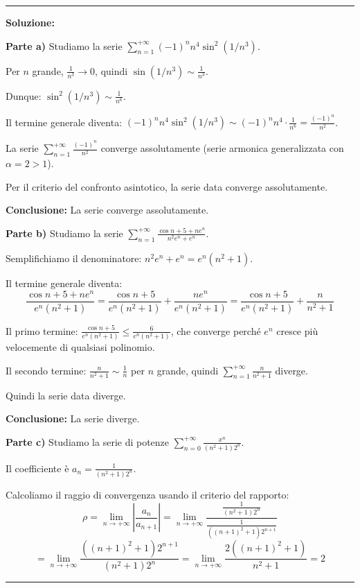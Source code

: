 \documentclass[12pt, a4paper]{article}
\newenvironment{solution}
{\par\noindent\rule{\textwidth}{0.4pt}\par\textbf{Soluzione:}\medskip\par}
{\par\rule{\textwidth}{0.4pt}\par\bigskip}
\begin{document}
\begin{solution}
\textbf{Parte a)} Studiamo la serie $\displaystyle\sum_{n=1}^{+\infty} (-1)^{n} n^{4} \sin^{2}(1/n^{3})$.

Per $n$ grande, $\frac{1}{n^3} \to 0$, quindi $\sin(1/n^3) \sim \frac{1}{n^3}$.

Dunque: $\sin^2(1/n^3) \sim \frac{1}{n^6}$.

Il termine generale diventa: $(-1)^n n^4 \sin^2(1/n^3) \sim (-1)^n n^4 \cdot \frac{1}{n^6} = \frac{(-1)^n}{n^2}$.

La serie $\displaystyle\sum_{n=1}^{+\infty} \frac{(-1)^n}{n^2}$ converge assolutamente (serie armonica generalizzata con $\alpha = 2 > 1$).

Per il criterio del confronto asintotico, la serie data converge assolutamente.

\textbf{Conclusione:} La serie converge assolutamente.

\vspace{0.5cm}

\textbf{Parte b)} Studiamo la serie $\displaystyle\sum_{n=1}^{+\infty} \frac{\cos n + 5 + ne^{n}}{n^{2}e^{n}+e^{n}}$.

Semplifichiamo il denominatore: $n^{2}e^{n}+e^{n} = e^n(n^2 + 1)$.

Il termine generale diventa:
\[
\frac{\cos n + 5 + ne^{n}}{e^n(n^2 + 1)} = \frac{\cos n + 5}{e^n(n^2 + 1)} + \frac{ne^{n}}{e^n(n^2 + 1)} = \frac{\cos n + 5}{e^n(n^2 + 1)} + \frac{n}{n^2 + 1}
\]

Il primo termine: $\frac{\cos n + 5}{e^n(n^2 + 1)} \leq \frac{6}{e^n(n^2 + 1)}$, che converge perché $e^n$ cresce più velocemente di qualsiasi polinomio.

Il secondo termine: $\frac{n}{n^2 + 1} \sim \frac{1}{n}$ per $n$ grande, quindi $\displaystyle\sum_{n=1}^{+\infty} \frac{n}{n^2 + 1}$ diverge.

Quindi la serie data diverge.

\textbf{Conclusione:} La serie diverge.

\vspace{0.5cm}

\textbf{Parte c)} Studiamo la serie di potenze $\displaystyle\sum_{n=0}^{+\infty} \frac{x^{n}}{(n^{2}+1)2^{n}}$.

Il coefficiente è $a_n = \frac{1}{(n^{2}+1)2^{n}}$.

Calcoliamo il raggio di convergenza usando il criterio del rapporto:
\[
\rho = \lim_{n \to +\infty} \left|\frac{a_n}{a_{n+1}}\right| = \lim_{n \to +\infty} \frac{\frac{1}{(n^{2}+1)2^{n}}}{\frac{1}{((n+1)^{2}+1)2^{n+1}}}
\]
\[
= \lim_{n \to +\infty} \frac{((n+1)^{2}+1)2^{n+1}}{(n^{2}+1)2^{n}} = \lim_{n \to +\infty} \frac{2((n+1)^{2}+1)}{n^{2}+1} = 2
\]


\end{solution}
\end{document}
